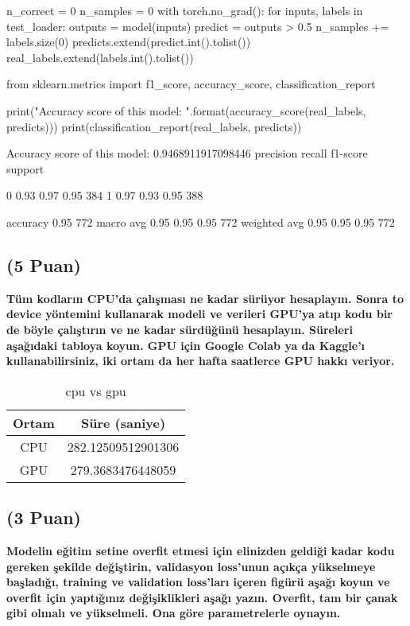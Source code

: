 \documentclass[11pt]{article}
\begin{document}
\begin{python}
n_correct = 0
n_samples = 0
with torch.no_grad():
    for inputs, labels in test_loader:
        outputs = model(inputs)
        predict = outputs > 0.5
        n_samples += labels.size(0)
        predicts.extend(predict.int().tolist())
        real_labels.extend(labels.int().tolist())

from sklearn.metrics import f1_score, accuracy_score, classification_report

print("Accuracy score of this model: {}".format(accuracy_score(real_labels, predicts)))
print(classification_report(real_labels, predicts))
\end{python}
\begin{python}
    Accuracy score of this model: 0.9468911917098446
              precision    recall  f1-score   support

           0       0.93      0.97      0.95       384
           1       0.97      0.93      0.95       388

    accuracy                           0.95       772
   macro avg       0.95      0.95      0.95       772
weighted avg       0.95      0.95      0.95       772
\end{python}

\subsection{(5 Puan)} \textbf{Tüm kodların CPU'da çalışması ne kadar sürüyor hesaplayın. Sonra to device yöntemini kullanarak modeli ve verileri GPU'ya atıp kodu bir de böyle çalıştırın ve ne kadar sürdüğünü hesaplayın. Süreleri aşağıdaki tabloya koyun. GPU için Google Colab ya da Kaggle'ı kullanabilirsiniz, iki ortam da her hafta saatlerce GPU hakkı veriyor.}

\begin{table}[ht!]
    \centering
    \caption{cpu vs gpu}
    \begin{tabular}{c|c}
        Ortam & Süre (saniye) \\\hline
        CPU & 282.12509512901306 \\
        GPU & 279.3683476448059\\
    \end{tabular}
    \label{tab:my_table}
\end{table}

\subsection{(3 Puan)} \textbf{Modelin eğitim setine overfit etmesi için elinizden geldiği kadar kodu gereken şekilde değiştirin, validasyon loss'unun açıkça yükselmeye başladığı, training ve validation loss'ları içeren figürü aşağı koyun ve overfit için yaptığınız değişiklikleri aşağı yazın. Overfit, tam bir çanak gibi olmalı ve yükselmeli. Ona göre parametrelerle oynayın.}
\end{document}
